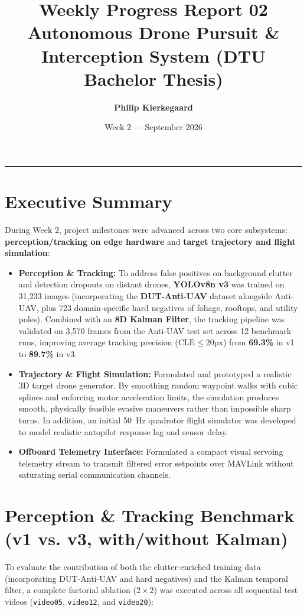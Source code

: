 \documentclass[11pt,a4paper]{article}
\title{\textbf{Weekly Progress Report 02}\\[0.2em]
\large Autonomous Drone Pursuit \& Interception System (DTU Bachelor Thesis)}
\author{\textbf{Philip Kierkegaard}}
\date{Week 2 --- September 2026}
\begin{document}
\maketitle

\vspace{-1.5em}
\noindent\rule{\textwidth}{0.4pt}

\section{Executive Summary}
During Week 2, project milestones were advanced across two core subsystems: \textbf{perception/tracking on edge hardware} and \textbf{target trajectory and flight simulation}:
\begin{itemize}[leftmargin=1.5em, itemsep=0.2em]
    \item \textbf{Perception \& Tracking:} To address false positives on background clutter and detection dropouts on distant drones, \textbf{YOLOv8n v3} was trained on 31,233 images (incorporating the \textbf{DUT-Anti-UAV} dataset alongside Anti-UAV, plus 723 domain-specific hard negatives of foliage, rooftops, and utility poles). Combined with an \textbf{8D Kalman Filter}, the tracking pipeline was validated on 3,570 frames from the Anti-UAV test set across 12 benchmark runs, improving average tracking precision ($\text{CLE} \le 20\text{px}$) from \textbf{69.3\%} in v1 to \textbf{89.7\%} in v3.
    \item \textbf{Trajectory \& Flight Simulation:} Formulated and prototyped a realistic 3D target drone generator. By smoothing random waypoint walks with cubic splines and enforcing motor acceleration limits, the simulation produces smooth, physically feasible evasive maneuvers rather than impossible sharp turns. In addition, an initial 50~Hz quadrotor flight simulator was developed to model realistic autopilot response lag and sensor delay.
    \item \textbf{Offboard Telemetry Interface:} Formulated a compact visual servoing telemetry stream to transmit filtered error setpoints over MAVLink without saturating serial communication channels.
\end{itemize}

\section{Perception \& Tracking Benchmark (v1 vs. v3, with/without Kalman)}
To evaluate the contribution of both the clutter-enriched training data (incorporating DUT-Anti-UAV and hard negatives) and the Kalman temporal filter, a complete factorial ablation ($2 \times 2$) was executed across all sequential test videos (\texttt{video05}, \texttt{video12}, and \texttt{video20}):
\end{document}
